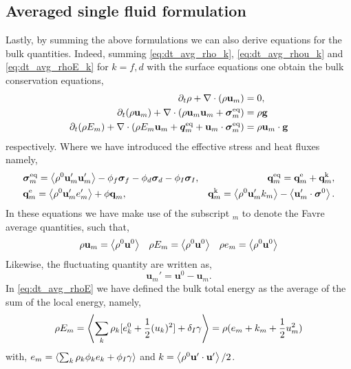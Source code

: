 \subsection{Averaged single fluid formulation}
Lastly, by summing the above formulations we can also derive equations for the bulk quantities. 
Indeed, summing \ref{eq:dt_avg_rho_k}, \ref{eq:dt_avg_rhou_k} and \ref{eq:dt_avg_rhoE_k} for $k=f,d$ with the surface equations one obtain the bulk conservation equations, 
\begin{align}
    \label{eq:dt_avg_rho}
    \partial_t \rho 
    + \mathbf{\nabla}\cdot (
         \rho \textbf{u}_m
    )
    &= 
    0,\\
    \label{eq:dt_avg_rhou}
    \partial_t ( \rho\textbf{u}_m)  
    + \mathbf{\nabla}\cdot (
         \rho\textbf{u}_m\textbf{u}_m
        + \bm{\sigma}^\text{eq}_m
    )
    &= 
     \rho \textbf{g} \\
    \label{eq:dt_avg_rhoE}
    \partial_t (\rho E_m)  
    + \mathbf{\nabla}\cdot (
        \rho E_m \textbf{u}_m
        + \bm{q}^\text{eq}_m
        + \textbf{u}_m \cdot \bm{\sigma}^\text{eq}_m
        )
    &= 
     \rho \textbf{u}_m  \cdot \textbf{g} 
\end{align} 
respectively. 
Where we have introduced the effective stress and heat fluxes namely, 
\begin{align*}
    &\bm{\sigma}^\text{eq}_m
    = 
    \avg{ \rho^0\textbf{u}'_m\textbf{u}'_m}
      - \phi_f\bm\sigma_f
      - \phi_d\bm\sigma_d
      - \phi_I\bm\sigma_I,%
    &\textbf{q}^\text{eq}_m
    =\textbf{q}^\text{e}_m +\textbf{q}^\text{k}_m,  \\
    &\textbf{q}^\text{e}_m
    = \avg{\rho^0\textbf{u}_m' e_m'} 
    + \phi\textbf{q}_m,
    &\textbf{q}^\text{k}_m
    = \avg{\rho^0 \textbf{u}_m' k_m} 
    - \avg{ \textbf{u}_m' \cdot \bm{\sigma}^0}.
\end{align*}
In these equations we have make use of the subscript $_m$ to denote the Favre average quantities, such that, 
\begin{align*}
    \rho \textbf{u}_m
    = \left<\rho^0 \textbf{u}^0\right>
    &&
    \rho E_m
    = \left<\rho^0 \textbf{u}^0\right>
    &&
    \rho e_m
    = \left<\rho^0 \textbf{u}^0\right>
\end{align*}
Likewise, the fluctuating quantity are written as, 
\begin{equation}
    \textbf{u}_m'
    = \textbf{u}^0 - \textbf{u}_m.
\end{equation}
In \ref{eq:dt_avg_rhoE} we have defined the bulk total energy as the average of the sum of the local energy, namely, 
\begin{equation}
    \rho E_m = \left<\sum_k \rho_k [e_k^0 + \frac{1}{2}(u_k)^2] 
    + \delta_I \gamma\right>
    = \rho( e_m +  k_m + \frac{1}{2}u_m^2)
\end{equation}
with, $e_m = \left<\sum_k \rho_k\phi_k e_k + \phi_I \gamma\right>$ and $k = \left<\rho^0 \textbf{u}'\cdot \textbf{u}'\right>/2$. 


